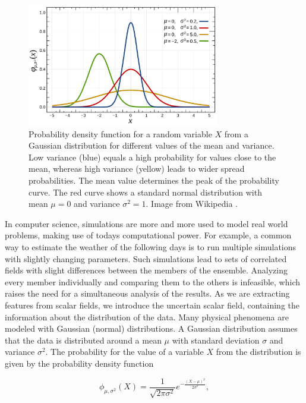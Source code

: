 \begin{figure}
  \centering
  \includegraphics[width=0.75\textwidth]{Images/gauss.pdf}
  \caption{Probability density function for a random variable $X$ from a
   Gaussian distribution for different values of the mean and variance.
   Low variance (blue) equals a high probability for values close to the
   mean, whereas high variance (yellow) leads to wider spread
   probabilities. The mean value determines the peak of the probability
   curve. The red curve shows a standard normal distribution with mean
   $\mu = 0$ and variance $\sigma^2 = 1$. Image from Wikipedia
   \cite{Gauss}.}
   \label{fig:gauss}
\end{figure}

In computer science, simulations are more and more used to model real
world problems, making use of todays computational power. For example, a
common way to estimate the weather of the following days is to run
multiple simulations with slightly changing parameters. Such simulations
lead to sets of correlated fields with slight differences between the
members of the ensemble. Analyzing every member individually and
comparing them to the others is infeasible, which raises the need for a
simultaneous analysis of the results. As we are extracting features from
scalar fields, we introduce the uncertain scalar field, containing the
information about the distribution of the data. Many physical phenomena
are modeled with Gaussian (normal) distributions. A Gaussian
distribution assumes that the data is distributed around a mean $\mu$
with standard deviation $\sigma$ and variance $\sigma^2$. The
probability for the value of a variable $X$ from the distribution is
given by the probability density function

\begin{equation}
  \phi_{\mu, \sigma^2}(X) = \frac{1}{\sqrt{2 \pi \sigma^2}} e^{-\frac{(X - \mu)^2}{2 \sigma^2}},
\end{equation}

